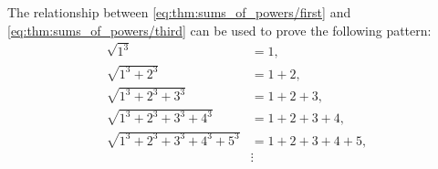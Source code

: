 \begin{example}\label{ex:sqrt_of_cubes}
  The relationship between \eqref{eq:thm:sums_of_powers/first} and \eqref{eq:thm:sums_of_powers/third} can be used to prove the following pattern:
  \begin{align*}
    \sqrt{ 1^3 }                               &= 1, \\
    \sqrt{ 1^3 + 2^3 }                         &= 1 + 2, \\
    \sqrt{ 1^3 + 2^3 + 3^3 }                   &= 1 + 2 + 3, \\
    \sqrt{ 1^3 + 2^3 + 3^3 + 4^3 }             &= 1 + 2 + 3 + 4, \\
    \sqrt{ 1^3 + 2^3 + 3^3 + 4^3 + 5^3 }       &= 1 + 2 + 3 + 4 + 5, \\
                                               &\vdots
  \end{align*}
\end{example}
